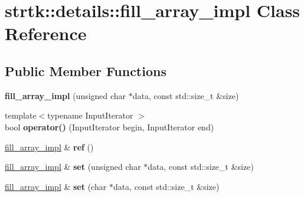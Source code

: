 \hypertarget{classstrtk_1_1details_1_1fill__array__impl}{\section{strtk\-:\-:details\-:\-:fill\-\_\-array\-\_\-impl Class Reference}
\label{classstrtk_1_1details_1_1fill__array__impl}
}
\subsection*{Public Member Functions}
\begin{DoxyCompactItemize}
\item 
\hypertarget{classstrtk_1_1details_1_1fill__array__impl_a27242e41aa49db6be6898079cf27d179}{{\bfseries fill\-\_\-array\-\_\-impl} (unsigned char $\ast$data, const std\-::size\-\_\-t \&size)}\label{classstrtk_1_1details_1_1fill__array__impl_a27242e41aa49db6be6898079cf27d179}

\item 
\hypertarget{classstrtk_1_1details_1_1fill__array__impl_afd197e166707c601b17ca031538a9a86}{{\footnotesize template$<$typename Input\-Iterator $>$ }\\bool {\bfseries operator()} (Input\-Iterator begin, Input\-Iterator end)}\label{classstrtk_1_1details_1_1fill__array__impl_afd197e166707c601b17ca031538a9a86}

\item 
\hypertarget{classstrtk_1_1details_1_1fill__array__impl_af412eaf902b84d225169f20f19150422}{\hyperlink{classstrtk_1_1details_1_1fill__array__impl}{fill\-\_\-array\-\_\-impl} \& {\bfseries ref} ()}\label{classstrtk_1_1details_1_1fill__array__impl_af412eaf902b84d225169f20f19150422}

\item 
\hypertarget{classstrtk_1_1details_1_1fill__array__impl_a411ba288a773c9a61f0fd360866c968f}{\hyperlink{classstrtk_1_1details_1_1fill__array__impl}{fill\-\_\-array\-\_\-impl} \& {\bfseries set} (unsigned char $\ast$data, const std\-::size\-\_\-t \&size)}\label{classstrtk_1_1details_1_1fill__array__impl_a411ba288a773c9a61f0fd360866c968f}

\item 
\hypertarget{classstrtk_1_1details_1_1fill__array__impl_a53eae616156f00db6f6aa348a7e86ecc}{\hyperlink{classstrtk_1_1details_1_1fill__array__impl}{fill\-\_\-array\-\_\-impl} \& {\bfseries set} (char $\ast$data, const std\-::size\-\_\-t \&size)}\label{classstrtk_1_1details_1_1fill__array__impl_a53eae616156f00db6f6aa348a7e86ecc}


\end{DoxyCompactItemize}
